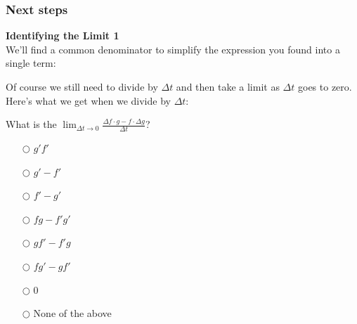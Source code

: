\documentclass[pdftex, brazil, 12pt, twoside]{article}
\begin{document}
\subsubsection{Next steps}
\label{u2-quotient-rule-next-steps}

\begin{exercise}
  \textbf{Identifying the Limit 1}\\%
  We'll find a common denominator to simplify the expression you found into a single term:
\begin{figure}[H]
  \begin{center}
  \end{center}
\end{figure}
Of course we still need to divide by $\Delta t$ and then take a limit as
$\Delta t$ goes to zero. Here's what we get when we divide by $\Delta t$:
\begin{figure}[H]
  \begin{center}
  \end{center}
\end{figure}

What is the $\displaystyle \lim_{\Delta t \to 0}{\frac{\Delta f \cdot g - f \cdot \Delta g}{\Delta t}}$?
\begin{itemize}
\item[$\bigcirc$] $g'f'$
\item[$\bigcirc$] $g' - f'$
\item[$\bigcirc$] $f' - g'$
\item[$\bigcirc$] $fg - f'g'$
\item[$\bigcirc$] $gf' - f'g$
\item[$\bigcirc$] $fg' - gf'$
\item[$\bigcirc$] 0
\item[$\bigcirc$] None of the above
\end{itemize}
\end{exercise}
\end{document}
